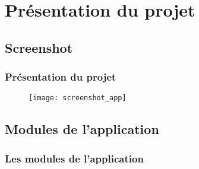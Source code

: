 \section{Présentation du projet}

\subsection{Screenshot}
{
\logo{}
\begin{frame}
\frametitle{Présentation du projet}
\begin{center}
    \begin{figure}[h!]
        \vspace*{-1.5em}
        \texttt{[image: screenshot\_app]}
    \end{figure}
\end{center}
\end{frame}
}

\subsection{Modules de l'application}

\begin{frame}
\frametitle{Les modules de l'application}
\begin{center}
\newcommand*{\mytextstyle}{\sffamily\Large\bfseries\color{black!85}}
\newcommand{\arcarrow}[3]{%
   \pgfmathsetmacro{\rin}{1.7}
   \pgfmathsetmacro{\rmid}{2.2}
   \pgfmathsetmacro{\rout}{2.7}
   \pgfmathsetmacro{\astart}{#1}
   \pgfmathsetmacro{\aend}{#2}
   \pgfmathsetmacro{\atip}{5}
   \fill[mygray, very thick] (\astart+\atip:\rin)
                         arc (\astart+\atip:\aend:\rin)
      -- (\aend-\atip:\rmid)
      -- (\aend:\rout)   arc (\aend:\astart+\atip:\rout)
      -- (\astart:\rmid) -- cycle;
   \path[
      decoration = {
         text along path,
         text = {|\mytextstyle|#3},
         text align = {align = center},
         raise = -1.0ex
      },
      decorate
   ](\astart+\atip:\rmid) arc (\astart+\atip:\aend+\atip:\rmid);
}
\end{center}
\end{frame}

